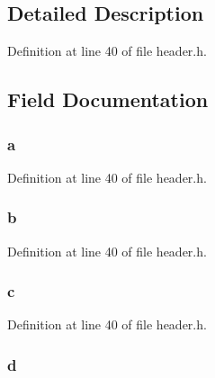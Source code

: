 \subsection{Detailed Description}


Definition at line 40 of file header.\-h.



\subsection{Field Documentation}
\hypertarget{structt__skill__list_a39a494bb9ce01ba13ea4577fe2b1cc79}{
\subsubsection[{a}]{ a}}\label{structt__skill__list_a39a494bb9ce01ba13ea4577fe2b1cc79}


Definition at line 40 of file header.\-h.

\hypertarget{structt__skill__list_a85ae40dbaecefd131b936ec65e9f4809}{
\subsubsection[{b}]{ b}}\label{structt__skill__list_a85ae40dbaecefd131b936ec65e9f4809}


Definition at line 40 of file header.\-h.

\hypertarget{structt__skill__list_ac9055dd2d5c45c223e3b0e1920c31493}{
\subsubsection[{c}]{ c}}\label{structt__skill__list_ac9055dd2d5c45c223e3b0e1920c31493}


Definition at line 40 of file header.\-h.

\hypertarget{structt__skill__list_a0bb2c4a26ff65aecd7a36ad7ee898cd8}{
\subsubsection[{d}]{ d}}\label{structt__skill__list_a0bb2c4a26ff65aecd7a36ad7ee898cd8}


